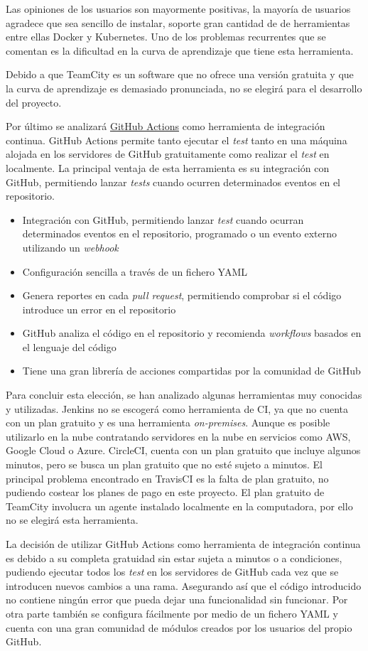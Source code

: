 Las opiniones de los usuarios son mayormente positivas, la mayoría de usuarios agradece que sea sencillo de instalar, soporte gran cantidad de de herramientas entre ellas Docker y Kubernetes. Uno de los problemas recurrentes que se comentan es la dificultad en la curva de aprendizaje que tiene esta herramienta. \cite{TeamCity2023}

Debido a que TeamCity es un software que no ofrece una versión gratuita y que la curva de aprendizaje es demasiado pronunciada, no se elegirá para el desarrollo del proyecto. 

Por último se analizará \href{https://github.com/features/actions}{GitHub Actions} como herramienta de integración continua. GitHub Actions permite tanto ejecutar el \emph{test} tanto en una máquina alojada en los servidores de GitHub gratuitamente como realizar el \emph{test} en localmente. La principal ventaja de esta herramienta es su integración con GitHub, permitiendo lanzar \emph{tests} cuando ocurren determinados eventos en el repositorio.

\begin{itemize}
    \item Integración con GitHub, permitiendo lanzar \emph{test} cuando ocurran determinados eventos en el repositorio, programado o un evento externo utilizando un \emph{webhook}
    \item Configuración sencilla a través de un fichero YAML
    \item Genera reportes en cada \emph{pull request}, permitiendo comprobar si el código introduce un error en el repositorio
    \item GitHub analiza el código en el repositorio y recomienda \emph{workflows} basados en el lenguaje del código
    \item Tiene una gran librería de acciones compartidas por la comunidad de GitHub
\end{itemize}

Para concluir esta elección, se han analizado algunas herramientas muy conocidas y utilizadas. Jenkins no se escogerá como herramienta de CI, ya que no cuenta con un plan gratuito y es una herramienta \emph{on-premises}. Aunque es posible utilizarlo en la nube contratando servidores en la nube en servicios como AWS, Google Cloud o Azure. CircleCI, cuenta con un plan gratuito que incluye algunos minutos, pero se busca un plan gratuito que no esté sujeto a minutos. El principal problema encontrado en TravisCI es la falta de plan gratuito, no pudiendo costear los planes de pago en este proyecto. El plan gratuito de TeamCity involucra un agente instalado localmente en la computadora, por ello no se elegirá esta herramienta. 

La decisión de utilizar GitHub Actions como herramienta de integración continua es debido a su completa gratuidad sin estar sujeta a minutos o a condiciones, pudiendo ejecutar todos los \emph{test} en los servidores de GitHub cada vez que se introducen nuevos cambios a una rama. Asegurando así que el código introducido no contiene ningún error que pueda dejar una funcionalidad sin funcionar. Por otra parte también se configura fácilmente por medio de un fichero YAML y cuenta con una gran comunidad de módulos creados por los usuarios del propio GitHub.

